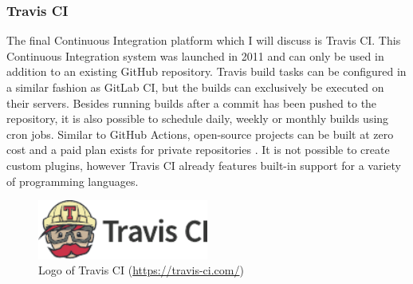 
\subsubsection{Travis CI}
The final Continuous Integration platform which I will discuss is Travis CI. This Continuous Integration system was launched in 2011 and can only be used in addition to an existing GitHub repository. Travis build tasks can be configured in a similar fashion as GitLab CI, but the builds can exclusively be executed on their servers. Besides running builds after a commit has been pushed to the repository, it is also possible to schedule daily, weekly or monthly builds using cron jobs. Similar to GitHub Actions, open-source projects can be built at zero cost and a paid plan exists for private repositories \cite{travisanalysis}. It is not possible to create custom plugins, however Travis CI already features built-in support for a variety of programming languages.

\begin{figure}[htbp!]
	\centering
	\includegraphics[width=0.5\textwidth]{assets/travis-ci.pdf}
	\caption{Logo of Travis CI (\url{https://travis-ci.com/})}
	\label{fig:travis-ci}
\end{figure}
